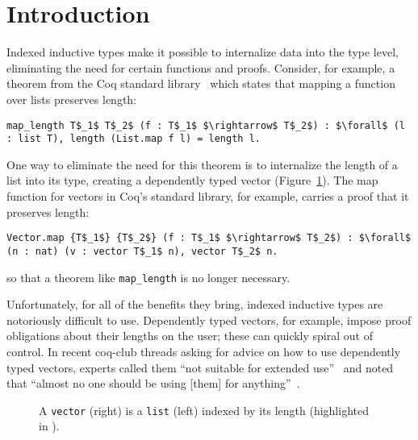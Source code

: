 \section{Introduction}

Indexed inductive types make it possible to internalize data into the type level, eliminating the need for certain functions and proofs.
Consider, for example, a theorem from the Coq standard library~\cite{stdlib}
which states that mapping a function over lists preserves length:
\begin{lstlisting}
map_length T$_1$ T$_2$ (f : T$_1$ $\rightarrow$ T$_2$) : $\forall$ (l : list T), length (List.map f l) = length l.
\end{lstlisting}
One way to eliminate the need for this theorem is to internalize the length of a list into its type,
creating a dependently typed vector (Figure~\ref{fig:listvect}).
The map function for vectors in Coq's standard library, for example, carries a proof that it preserves length:
\begin{lstlisting}
Vector.map {T$_1$} {T$_2$} (f : T$_1$ $\rightarrow$ T$_2$) : $\forall$ (n : nat) (v : vector T$_1$ n), vector T$_2$ n.
\end{lstlisting}
so that a theorem like \lstinline{map_length} is no longer necessary.

Unfortunately, for all of the benefits they bring, indexed inductive types are notoriously difficult to use.
Dependently typed vectors, for example, impose proof obligations about their lengths on the user;
these can quickly spiral out of control.
In recent coq-club threads asking for advice on how to use dependently typed vectors, experts called them
``not suitable for extended use''~\cite{emiliodom} and noted that ``almost no one should be using [them] for anything''~\cite{adamchlipala}.

\begin{figure}
\begin{minipage}{0.35\textwidth}
   
\end{minipage}
\hfill
\begin{minipage}{0.65\textwidth}
   
\end{minipage}
\vspace{-0.3cm}
\caption{A \lstinline{vector} (right) is a \lstinline{list} (left) indexed by its length (highlighted in ).}
\label{fig:listvect}
\end{figure}

